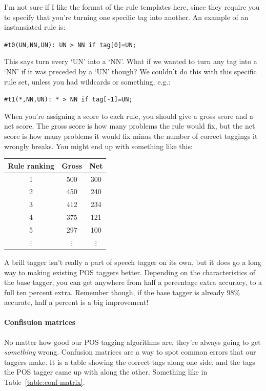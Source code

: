 \begin{description}
  I'm not sure if I like the format of the rule templates here, since they
  require you to specify that you're turning one specific tag into another. An
  example of an instansiated rule is:

  \texttt{\#t0(UN,NN,UN): UN > NN if tag[0]=UN;}

  This says turn every `UN' into a `NN'. What if we wanted to turn any tag into
  a `NN' if it was preceded by a `UN' though? We couldn't do this with this
  specific rule set, unless you had wildcards or something, e.g.:

  \texttt{\#t1(*,NN,UN): * > NN if tag[-1]=UN;}

  When you're assigning a score to each rule, you should give a gross score and
  a net score. The gross score is how many problems the rule would fix, but the
  net score is how many problems it would fix minus the number of correct
  taggings it wrongly breaks. You might end up with something like this:

  \begin{center}
    \begin{tabular} {|c|c|c|}
      \hline
      Rule ranking & Gross & Net\\ \hline
      1 & 500 & 300\\ \hline
      2 & 450 & 240\\ \hline
      3 & 412 & 234\\ \hline
      4 & 375 & 121\\ \hline
      5 & 297 & 100\\ \hline
      $\vdots$ & $\vdots$ & $\vdots$\\ 
    \end{tabular}
  \end{center}

  A brill tagger isn't really a part of speech tagger on its own, but it does go
  a long way to making existing POS taggers better. Depending on the
  characteristics of the base tagger, you can get anywhere from half a
  percentage extra accuracy, to a full ten percent extra. Remember though, if
  the base tagger is already 98\% accurate, half a percent is a big improvement!
\end{description}

\paragraph{Confisuion matrices}

No matter how good our POS tagging algorithms are, they're always going to get
\textit{something} wrong. Confusion matrices are a way to spot common errors
that our taggers make. It is a table showing the correct tags along one side,
and the tags the POS tagger came up with along the other. Something like in
Table~\ref{table:conf-matrix}.

